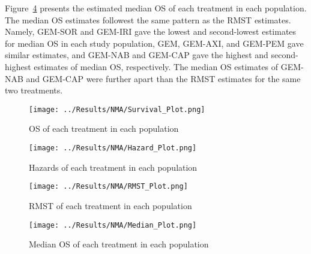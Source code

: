 Figure~\ref{fig:pred_medianbc} presents the estimated median OS of each treatment in each population. The median OS estimates followest the same pattern as the RMST estimates. Namely, GEM-SOR and GEM-IRI gave the lowest and second-lowest estimates for median OS in each study population, GEM, GEM-AXI, and GEM-PEM gave similar estimates, and GEM-NAB and GEM-CAP gave the highest and second-highest estimates of median OS, respectively. The median OS estimates of GEM-NAB and GEM-CAP were further apart than the RMST estimates for the same two treatments. 

\begin{figure}[h]
    \centering
    \texttt{[image: ../Results/NMA/Survival\_Plot.png]}
    \caption{OS of each treatment in each population}
    \label{fig:pred_survbc}
\end{figure}

\begin{figure}[h]
    \centering
    \texttt{[image: ../Results/NMA/Hazard\_Plot.png]}
    \caption{Hazards of each treatment in each population}
    \label{fig:pred_hazardbc}
\end{figure}

\begin{figure}[h]
    \centering
    \texttt{[image: ../Results/NMA/RMST\_Plot.png]}
    \caption{RMST of each treatment in each population}
    \label{fig:pred_rmstbc}
\end{figure}

\begin{figure}[h]
    \centering
    \texttt{[image: ../Results/NMA/Median\_Plot.png]}
    \caption{Median OS of each treatment in each population}
    \label{fig:pred_medianbc}
\end{figure}

